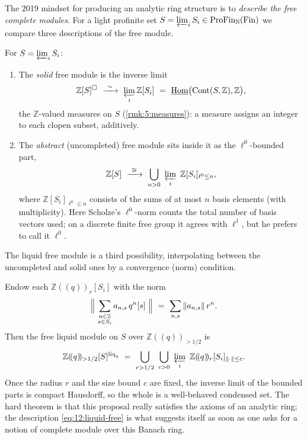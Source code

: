 The 2019 mindset for producing an analytic ring structure is to \emph{describe
the free complete modules}. For a light profinite set $S=\varprojlim_i S_i\in
\mathrm{ProFin}_{\mathbb{N}}(\mathrm{Fin})$ we compare three descriptions of the free
module.

\begin{example}
\label{ex:12:free-solid-abstract}
For $S=\varprojlim_i S_i$:
\begin{enumerate}
\item The \emph{solid} free module is the inverse limit
\begin{equation*}
\mathbb{Z}[S]^{\solid}\ \xrightarrow{\ \sim\ }\ \varprojlim_i \mathbb{Z}[S_i]
\ =\ \iHom\bigl(\Cont(S,\mathbb{Z}),\mathbb{Z}\bigr),
\end{equation*}
the $\mathbb{Z}$-valued measures on $S$ (\cref{rmk:5:measures}): a measure assigns
an integer to each clopen subset, additively.
\item The \emph{abstract} (uncompleted) free module sits inside it as the
$\ell^{0}$-bounded part,
\begin{equation}
\label{eq:12:free-abstract}
\mathbb{Z}[S]\ \xrightarrow{\ \cong\ }\
\bigcup_{n>0}\ \varprojlim_i\ \mathbb{Z}[S_i]_{\ell^{0}\le n},
\end{equation}
where $\mathbb{Z}[S_i]_{\ell^{0}\le n}$ consists of the sums of at most $n$ basis
elements (with multiplicity). Here Scholze's $\ell^{0}$-norm counts the total
number of basis vectors used; on a discrete finite free group it agrees with
$\ell^{1}$, but he prefers to call it $\ell^{0}$.
\end{enumerate}
\end{example}

The liquid free module is a third possibility, interpolating between the
uncompleted and solid ones by a convergence (norm) condition.

\begin{definition}
\label{def:12:liquid-free}
Endow each $\mathbb{Z}(\!(q)\!)_{r}[S_i]$ with the norm
\begin{equation*}
\Bigl\|\ \sum_{\substack{n\in\mathbb{Z}\\ s\in S_i}} a_{n,s}\,q^{n}[s]\ \Bigr\|
\ =\ \sum_{n,s}\|a_{n,s}\|\,r^{n}.
\end{equation*}
Then the free liquid module on $S$ over $\mathbb{Z}(\!(q)\!)_{>1/2}$ is
\begin{equation}
\label{eq:12:liquid-free}
\mathbb{Z}(\!(q)\!)_{>1/2}[S]^{\mathrm{liq}_q}\ =\
\bigcup_{r>1/2}\ \bigcup_{c>0}\ \varprojlim_i\
\mathbb{Z}(\!(q)\!)_{r}[S_i]_{\|\cdot\|\le c}.
\end{equation}
Once the radius $r$ and the size bound $c$ are fixed, the inverse limit of the
bounded parts is compact Hausdorff, so the whole is a well-behaved condensed
set. The hard theorem \cite{scholze2020analytic} is that this proposal really
satisfies the axioms of an analytic ring; the description
\eqref{eq:12:liquid-free} is what suggests itself as soon as one asks for a
notion of complete module over this Banach ring.
\end{definition}

